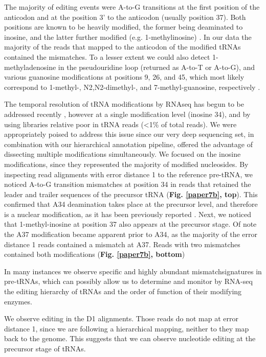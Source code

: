 \documentclass[12pt]{rockefeller}
\begin{document}
The majority of editing events were A-to-G transitions at the first position of the anticodon and at the position 3’ to the anticodon (usually position 37). Both positions are known to be heavily modified, the former being deaminated to inosine, and the latter further modified (e.g. 1-methylinosine) \cite{Machnicka:2013ky}. In our data the majority of the reads that mapped to the anticodon of the modified tRNAs contained the mismatches. To a lesser extent we could also detect 1-methyladenosine in the pseudouridine loop (returned as A-to-T or A-to-G), and various guanosine modifications at positions 9, 26, and 45, which most likely correspond to 1-methyl-, N2,N2-dimethyl-, and 7-methyl-guanosine, respectively \cite{Machnicka:2013ky}.

The temporal resolution of tRNA modifications by RNAseq has begun to be addressed recently  \cite{Torres:2015ed}, however at a single modification level (inosine 34), and by using libraries relative poor in tRNA reads (<1\% of total reads). We were appropriately poised to address this issue since our very deep sequencing set, in combination with our hierarchical annotation pipeline, offered the advantage of dissecting multiple modifications simultaneously. We focused on the inosine modifications, since they represented the majority of modified nucleosides. By inspecting read alignments with error distance 1 to the reference pre-tRNA, we noticed A-to-G transition mismatches at position 34 in reads that retained the leader and trailer sequences of the precursor tRNA (\textbf{Fig. \ref{paper7b}, top}). 
This confirmed that A34 deamination takes place at the precursor level, and therefore is a nuclear modification, as it has been previously reported \cite{Torres:2015ed}. 
Next, we noticed that 1-methyl-inosine at position 37 also appears at the precursor stage. Of note the A37 modification became apparent prior to A34, as the majority of the error distance 1 reads contained a mismatch at A37. Reads with two mismatches contained both modifications (\textbf{Fig. \ref{paper7b}, bottom})

In many instances we observe specific and highly abundant mismatchsignatures in pre-tRNAs, which can possibly allow us to determine and monitor by RNA-seq the editing hierarchy of tRNAs and the order of function of their modifying enzymes. 

We observe editing in the D1 alignments. Those reads do not map at error distance 1, since we are following a hierarchical mapping, neither to they map back to the genome. This suggests that we can observe nucleotide editing at the precursor stage of tRNAs. 
 
\end{document}
